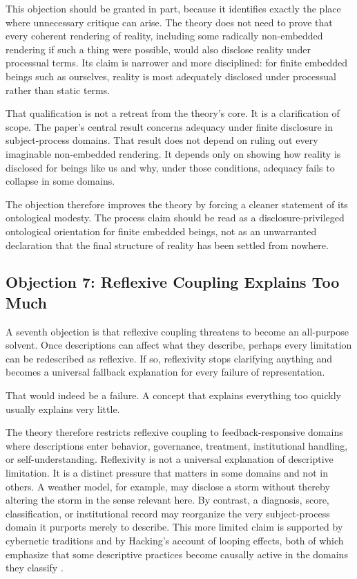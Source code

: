 \documentclass[11pt]{article}
\begin{document}
This objection should be granted in part, because it identifies exactly the place where unnecessary critique can arise. The theory does not need to prove that every coherent rendering of reality, including some radically non-embedded rendering if such a thing were possible, would also disclose reality under processual terms. Its claim is narrower and more disciplined: for finite embedded beings such as ourselves, reality is most adequately disclosed under processual rather than static terms.

That qualification is not a retreat from the theory's core. It is a clarification of scope. The paper's central result concerns adequacy under finite disclosure in subject-process domains. That result does not depend on ruling out every imaginable non-embedded rendering. It depends only on showing how reality is disclosed for beings like us and why, under those conditions, adequacy fails to collapse in some domains.

The objection therefore improves the theory by forcing a cleaner statement of its ontological modesty. The process claim should be read as a disclosure-privileged ontological orientation for finite embedded beings, not as an unwarranted declaration that the final structure of reality has been settled from nowhere.

\subsection{Objection 7: Reflexive Coupling Explains Too Much}

A seventh objection is that reflexive coupling threatens to become an all-purpose solvent. Once descriptions can affect what they describe, perhaps every limitation can be redescribed as reflexive. If so, reflexivity stops clarifying anything and becomes a universal fallback explanation for every failure of representation.

That would indeed be a failure. A concept that explains everything too quickly usually explains very little.

The theory therefore restricts reflexive coupling to feedback-responsive domains where descriptions enter behavior, governance, treatment, institutional handling, or self-understanding. Reflexivity is not a universal explanation of descriptive limitation. It is a distinct pressure that matters in some domains and not in others. A weather model, for example, may disclose a storm without thereby altering the storm in the sense relevant here. By contrast, a diagnosis, score, classification, or institutional record may reorganize the very subject-process domain it purports merely to describe. This more limited claim is supported by cybernetic traditions and by Hacking's account of looping effects, both of which emphasize that some descriptive practices become causally active in the domains they classify \cite{Bateson1972,Pask1975,Hacking1995}.
\end{document}

